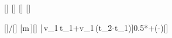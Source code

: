 [\kg]
[\second]
[\mps]
[\second]

[]{\vEX/\tEX}[\mpss]
[m\,]{\mWX*\aWX}[\newton]
[\,v_1\,t_1+v_1\,(t_2-t_1)]{0.5*\vEX*\tEX+\vEX*(\tZX-\tEX)}[\meter]
